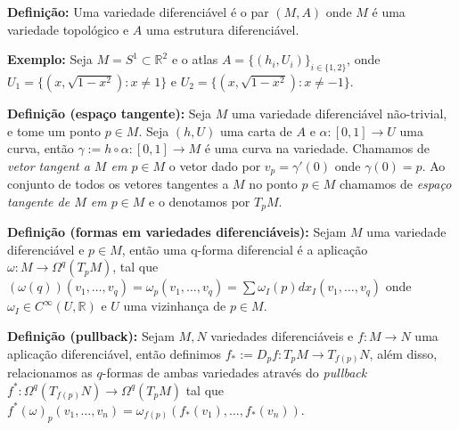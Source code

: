 \documentclass{article}
\begin{document}
	\vspace{2mm}
	\textbf{Definição:} Uma variedade diferenciável é o par $(M, A)$ onde $M$ é uma variedade topológico e $A$ uma estrutura diferenciável. 
	
	\vspace{2mm}
	\textbf{Exemplo:} Seja $M = S^{1} \subset \mathbb{R}^{2}$ e o atlas $A = \{(h_{i}, U_{i})\}_{i \in \{1,2\}}$, onde $U_{1} = \{(x, \sqrt{1-x^{2}}): x \neq 1 \}$ e  $U_{2} = \{(x, \sqrt{1-x^{2}}): x \neq -1 \}$.
	
	\vspace{2mm}
	\textbf{Definição (espaço tangente):} Seja $M$ uma variedade diferenciável não-trivial, e tome um ponto $p \in M$. Seja $(h, U)$ uma carta de $A$ e $\alpha : [0,1] \to U$ uma curva, então $\gamma := h \circ \alpha : [0,1] \to M$ é uma curva na variedade. Chamamos de \textit{vetor tangent a $M$ em $p \in M$} o vetor dado por $v_{p} = \gamma'(0)$ onde $\gamma(0) =p$. Ao conjunto de todos os vetores tangentes a $M$ no ponto $p \in M$ chamamos de \textit{espaço tangente de $M$ em $p \in M$} e o denotamos por $T_{p}M$.
	
	\vspace{2mm}
	\textbf{Definição (formas em variedades diferenciáveis):} Sejam $M$ uma variedade diferenciável e $p \in M$, então uma q-forma diferencial é a aplicação $\omega : M \to \Omega^{q}(T_{p}M)$, tal que $(\omega(q))(v_{1}, \dots, v_{q}) = \omega_{p}(v_{1}, \dots, v_{q}) = \sum \omega_{I}(p)dx_{I}(v_{1}, \dots, v_{q})$ onde $\omega_{I} \in C^{\infty}(U, \mathbb{R})$ e $U$ uma vizinhança de $p \in M$.
	
	\vspace{2mm}
	\textbf{Definição (pullback):} Sejam $M,N$ variedades diferenciáveis e $f: M \to N$ uma aplicação diferenciável, então definimos $f_{*} := D_{p}f:T_{p}M \to T_{f(p)}N$, além disso, relacionamos as $q$-formas de ambas variedades através do \textit{pullback} $f^{*} : \Omega^{q}(T_{f(p)}N) \to \Omega^{q}(T_{p}M)$ tal que $
	f^{*}(\omega)_{p}(v_{1}, \dots, v_{n}) = \omega_{f(p)}(f_{*}(v_{1}), \dots, f_{*}(v_{n}))$.
	
\end{document}
